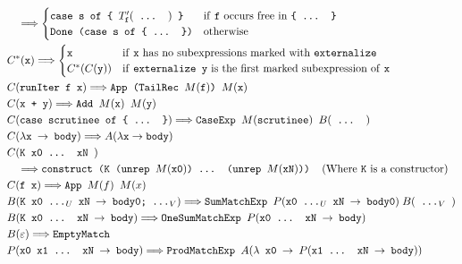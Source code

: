 \documentclass[runningheads, a4paper]{llncs}
\newcommand{\expr}[1]{(#1)} %
\newcommand{\rarr}{\rightarrow}
\newcommand{\rewrites}{\Longrightarrow}
\newcommand{\ttt}{\texttt}
\begin{document}
\begin{figure}
{\begin{minipage}{\linewidth}
\begin{align*}
    &\quad\rewrites
      \begin{cases}
        \ttt{case s of \{ $T'_{\ttt{f}}\expr{\ttt{ ... }}$ \}} & \text{if \ttt{f} occurs free in \ttt{\{ ... \}}}\\
        \ttt{Done (case s of \{ ... \})} & \text{otherwise}
      \end{cases}\\
  &C^{*}\expr{\ttt{x}} \rewrites
    \begin{cases}
      \ttt{x} & \text{if \ttt{x} has no subexpressions marked with \ttt{externalize}}\\
      C^{*}\expr{C\expr{\ttt{y}}} & \text{if \ttt{externalize y} is the first marked subexpression of \ttt{x}}\\
    \end{cases}\\
  &C\expr{\ttt{runIter f x}} \rewrites \ttt{App (TailRec $M\expr{\ttt{f}}$) $M\expr{\ttt{x}}$}\\
  &C\expr{\ttt{x + y}} \rewrites \ttt{Add $M\expr{\ttt{x}}$ $M\expr{\ttt{y}}$}\\
  &C\expr{\ttt{case scrutinee of \{ ... \}}} \rewrites \ttt{CaseExp $M\expr{\ttt{scrutinee}}$ } B\expr{\ttt{ ... }}\\
  &C\expr{\ttt{$\lambda$x $\rarr$ body}} \rewrites A\expr{\lambda \ttt{x} \rarr \ttt{body}}\\
  &C\expr{\ttt{K x0 ... xN }}\\
    &\quad\rewrites \ttt{construct (K (unrep $M\expr{\ttt{x0}}$) ... (unrep $M\expr{\ttt{xN}}$))}\;\;\;\;\text{(Where \ttt{K} is a constructor)}\\
  &C\expr{\ttt{f x}} \rewrites \ttt{App $M\expr{f}$ $M\expr{x}$}\\
  &B\expr{\ttt{K x0 ...$_U$ xN $\rarr$ body0; ...$_V$}} \rewrites \ttt{SumMatchExp }P\expr{\ttt{x0 ...$_U$ xN $\rarr$ body0}}\; B\expr{\ttt{ ...$_V$ }}\\
  &B\expr{\ttt{K x0 ... xN $\rarr$ body}} \rewrites \ttt{OneSumMatchExp }P\expr{\ttt{x0 ... xN $\rarr$ body}}\\
  &B\expr{\ttt{$\varepsilon$}} \rewrites \ttt{EmptyMatch}\\
  &P\expr{\ttt{x0 x1 ... xN $\rarr$ body}} \rewrites \ttt{ProdMatchExp }A\expr{\ttt{$\lambda$ x0 $\rarr$ $P\expr{\ttt{x1 ... xN $\rarr$ body}}$}}\\

\end{align*}
\end{minipage}}
\end{figure}
\end{document}
